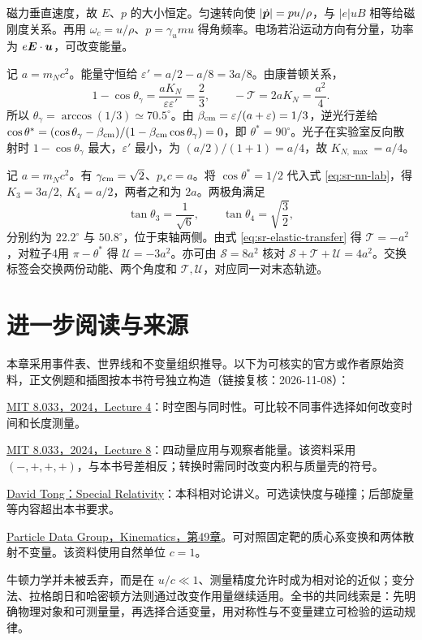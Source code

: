 \begin{bookexercises}
磁力垂直速度，故 $E$、$p$ 的大小恒定。匀速转向使 $|\dot{\boldsymbol{p}}|=pu/\rho$，与 $|e|uB$ 相等给磁刚度关系。再用 $\omega_c=u/\rho$、$p=\gamma_um u$ 得角频率。电场若沿运动方向有分量，功率为 $e\boldsymbol{E}\cdot\boldsymbol{u}$，可改变能量。
\item 记 $a=m_Nc^2$。能量守恒给 $\varepsilon'=a/2-a/8=3a/8$。由康普顿关系，
\[
1-\cos\theta_\gamma=\frac{aK_N}{\varepsilon\varepsilon'}=\frac23 ,
\qquad
-\mathcal T=2aK_N=\frac{a^2}{4}.
\]
所以 $\theta_\gamma=\arccos(1/3)\simeq70.5^\circ$。由 $\beta_{\rm cm}=\varepsilon/(a+\varepsilon)=1/3$，逆光行差给 $\cos\theta^*=(\cos\theta_\gamma-\beta_{\rm cm})/(1-\beta_{\rm cm}\cos\theta_\gamma)=0$，即 $\theta^*=90^\circ$。光子在实验室反向散射时 $1-\cos\theta_\gamma$ 最大，$\varepsilon'$ 最小，为 $(a/2)/(1+1)=a/4$，故 $K_{N,\max}=a/4$。
\item 记 $a=m_Nc^2$。有 $\gamma_{\rm cm}=\sqrt2$、$p_*c=a$。将 $\cos\theta^*=1/2$ 代入式 \eqref{eq:sr-nn-lab}，得 $K_3=3a/2,\ K_4=a/2$，两者之和为 $2a$。两极角满足
\[
\tan\theta_3=\frac1{\sqrt6},\qquad
\tan\theta_4=\sqrt{\frac32},
\]
分别约为 $22.2^\circ$ 与 $50.8^\circ$，位于束轴两侧。由式 \eqref{eq:sr-elastic-transfer} 得 $\mathcal T=-a^2$，对粒子4用 $\pi-\theta^*$ 得 $\mathcal U=-3a^2$。亦可由 $\mathcal S=8a^2$ 核对 $\mathcal S+\mathcal T+\mathcal U=4a^2$。交换标签会交换两份动能、两个角度和 $\mathcal T,\mathcal U$，对应同一对末态轨迹。
\end{bookexercises}

\section*{进一步阅读与来源}
本章采用事件表、世界线和不变量组织推导。以下为可核实的官方或作者原始资料，正文例题和插图按本书符号独立构造（链接复核：2026-11-08）：
\begin{bookreading}
\item \href{https://ocw.mit.edu/courses/8-033-introduction-to-relativity-and-spacetime-physics-fall-2024/mit8_033_f24_lec04.pdf}{MIT 8.033，2024，Lecture 4}：时空图与同时性。可比较不同事件选择如何改变时间和长度测量。
\item \href{https://ocw.mit.edu/courses/8-033-introduction-to-relativity-and-spacetime-physics-fall-2024/mit8_033_f24_lec08.pdf}{MIT 8.033，2024，Lecture 8}：四动量应用与观察者能量。该资料采用 $(-,+,+,+)$，与本书号差相反；转换时需同时改变内积与质量壳的符号。
\item \href{https://davidtong.org/pdfs/teaching/dynamics-and-relativity/dynrel7.pdf}{David Tong：Special Relativity}：本科相对论讲义。可选读快度与碰撞；后部旋量等内容超出本书要求。
\item \href{https://pdg.lbl.gov/2024/reviews/rpp2024-rev-kinematics.pdf}{Particle Data Group，Kinematics，第49章}。可对照固定靶的质心系变换和两体散射不变量。该资料使用自然单位 $c=1$。
\end{bookreading}
牛顿力学并未被丢弃，而是在 $u/c\ll1$、测量精度允许时成为相对论的近似；变分法、拉格朗日和哈密顿方法则通过改变作用量继续适用。全书的共同线索是：先明确物理对象和可测量量，再选择合适变量，用对称性与不变量建立可检验的运动规律。
